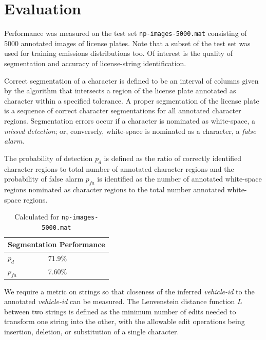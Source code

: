 \documentclass[a4paper,12pt]{article}
\begin{document}
\section{Evaluation}
Performance was measured on the test set \texttt{np-images-5000.mat}
consisting of 5000 annotated images of license plates.  Note that a
subset of the test set was used for training emissions distributions
too. Of interest is the quality of segmentation and accuracy of
license-string identification.  

Correct segmentation of a character is defined to be an interval of
columns given by the algorithm that intersects a region of the license
plate annotated as character within a specified tolerance. A proper
segmentation of the license plate is a sequence of correct character
segmentations for all annotated character regions.  Segmentation
errors occur if a character is nominated as white-space, a
\emph{missed detection}; or, conversely, white-space is nominated as a
character, a \emph{false alarm}.

The probability of detection $p_d$ is defined as the ratio of correctly
identified character regions to total number of annotated character regions
and the probability of false alarm $p_{fa}$ is identified as the number
of annotated white-space regions nominated as character regions to the
total number annotated white-space regions.

\begin{table}[ht]
\begin{center}
\begin{tabular}{|l|l|}
  \hline
  \multicolumn{2}{|c|}{Segmentation Performance} \\
  \hline
  $p_d$ & 71.9\% \\
  $p_{fa}$ & 7.60\% \\
  \hline
\end{tabular}
\caption{Calculated for \texttt{np-images-5000.mat}}
\end{center}
\end{table}

We require a metric on strings so that closeness of the inferred
\emph{vehicle-id} to the annotated \emph{vehicle-id} can be
measured. The Lenvenstein distance function $L$ between two strings is
defined as the minimum number of edits needed to transform one string
into the other, with the allowable edit operations being insertion,
deletion, or substitution of a single character. 
\end{document}
